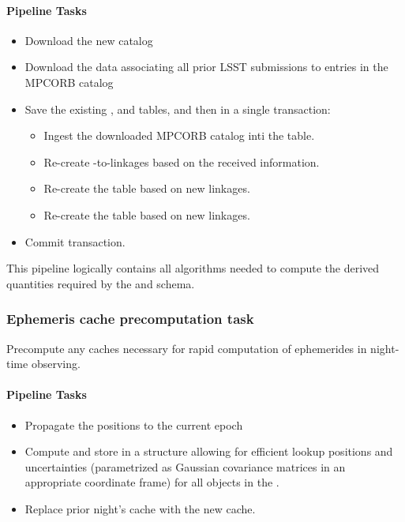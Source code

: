 \paragraph{Pipeline Tasks}

\begin{itemize}
	\item Download the new \MPCORB catalog
	\item Download the data associating all prior LSST submissions to entries in the MPCORB catalog
	\item Save the existing \MPCORB, \SSObject and \SSSource tables, and then in a single transaction:
	\begin{itemize}
		\item Ingest the downloaded MPCORB catalog inti the \MPCORB table.
		\item Re-create \DIASource-to-\MPCORB linkages based on the received information.
		\item Re-create the \SSObject table based on new linkages.
		\item Re-create the \SSSource table based on new linkages.
	\end{itemize}
	\item Commit transaction.
\end{itemize}

This pipeline logically contains all algorithms needed to compute the derived quantities required by the \SSObject and \SSSource schema.

\subsubsection{Ephemeris cache precomputation task}

Precompute any caches necessary for rapid computation of ephemerides in night-time observing.

\paragraph{Pipeline Tasks}

\begin{itemize}
	\item Propagate the \MPCORB positions to the current epoch
	\item Compute and store in a structure allowing for efficient lookup positions and uncertainties (parametrized as Gaussian covariance matrices in an appropriate coordinate frame) for all objects in the \MPCORB.
	\item Replace prior night's cache with the new cache.
\end{itemize}

